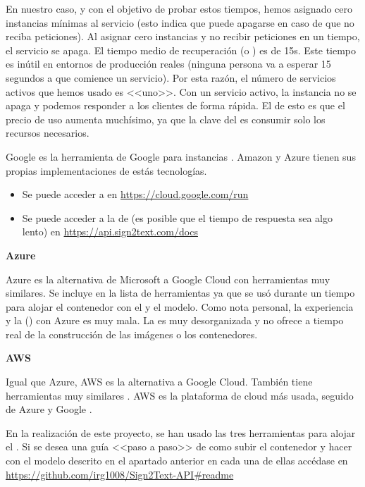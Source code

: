 En nuestro caso, y con el objetivo de probar estos tiempos, hemos asignado cero instancias mínimas al servicio (esto indica que puede apagarse en caso de que no reciba peticiones). Al asignar cero instancias y no recibir peticiones en un tiempo, el servicio se apaga. El tiempo medio de recuperación (o ) es de 15s. Este tiempo es inútil en entornos de producción reales (ninguna persona va a esperar 15 segundos a que comience un servicio). Por esta razón, el número de servicios activos que hemos usado es <<uno>>. Con un servicio activo, la instancia no se apaga y podemos responder a los clientes de forma rápida. El  de esto es que el precio de uso aumenta muchísimo, ya que la clave del  es consumir solo los recursos necesarios.

Google  es la herramienta de Google para instancias . Amazon y Azure tienen sus propias implementaciones de estás tecnologías.

\begin{itemize}
  \item Se puede acceder a  en \url{https://cloud.google.com/run}
  \item Se puede acceder a la  de  (es posible que el tiempo de respuesta sea algo lento) en \url{https://api.sign2text.com/docs}
\end{itemize}

\textbf{Azure}

Azure es la alternativa de Microsoft a Google Cloud con herramientas muy similares. Se incluye en la lista de herramientas ya que se usó durante un tiempo para alojar el contenedor con el  y el modelo. Como nota personal, la experiencia y la  () con Azure es muy mala. La  es muy desorganizada y no ofrece  a tiempo real de la construcción de las imágenes o los contenedores.

\textbf{AWS}

Igual que Azure, AWS es la alternativa a Google Cloud. También tiene herramientas muy similares . AWS es la plataforma de cloud más usada, seguido de Azure y Google .

En la realización de este proyecto, se han usado las tres herramientas para alojar el . Si se desea una guía <<paso a paso>> de como subir el contenedor y hacer  con el modelo descrito en el apartado anterior en cada una de ellas accédase en \url{https://github.com/irg1008/Sign2Text-API#readme}

